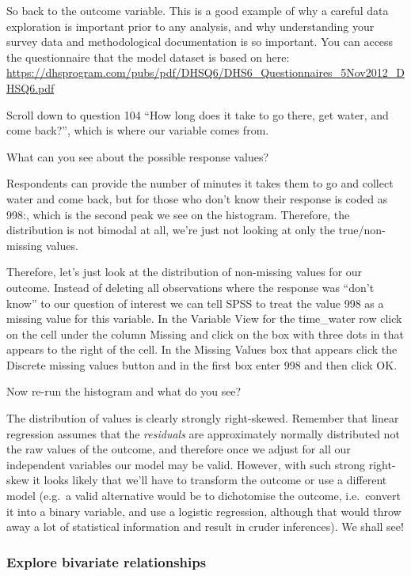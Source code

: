 \documentclass[
]{book}
\begin{document}
So back to the outcome variable. This is a good example of why a careful data exploration is important prior to any analysis, and why understanding your survey data and methodological documentation is so important. You can access the questionnaire that the model dataset is based on here: \url{https://dhsprogram.com/pubs/pdf/DHSQ6/DHS6_Questionnaires_5Nov2012_DHSQ6.pdf}

Scroll down to question 104 ``How long does it take to go there, get water, and come back?'', which is where our variable comes from.

What can you see about the possible response values?

Respondents can provide the number of minutes it takes them to go and collect water and come back, but for those who don't know their response is coded as 998:, which is the second peak we see on the histogram. Therefore, the distribution is not bimodal at all, we're just not looking at only the true/non-missing values.

Therefore, let's just look at the distribution of non-missing values for our outcome. Instead of deleting all observations where the response was ``don't know'' to our question of interest we can tell SPSS to treat the value 998 as a missing value for this variable. In the Variable View for the time\_water row click on the cell under the column Missing and click on the box with three dots in that appears to the right of the cell. In the Missing Values box that appears click the Discrete missing values button and in the first box enter 998 and then click OK.

Now re-run the histogram and what do you see?

The distribution of values is clearly strongly right-skewed. Remember that linear regression assumes that the \emph{residuals} are approximately normally distributed not the raw values of the outcome, and therefore once we adjust for all our independent variables our model may be valid. However, with such strong right-skew it looks likely that we'll have to transform the outcome or use a different model (e.g.~a valid alternative would be to dichotomise the outcome, i.e.~convert it into a binary variable, and use a logistic regression, although that would throw away a lot of statistical information and result in cruder inferences). We shall see!

\hypertarget{explore-bivariate-relationships}{%
\subsubsection{Explore bivariate relationships}\label{explore-bivariate-relationships}}
\end{document}

